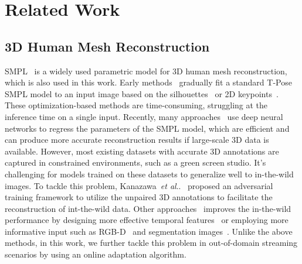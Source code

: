 \documentclass[10pt,journal,compsoc]{IEEEtran}
\makeatletter
\DeclareRobustCommand\onedot{\futurelet\@let@token\@onedot}
\def\@onedot{\ifx\@let@token.\else.\null\fi\xspace}
\def\etal{\emph{et al}\onedot}
\makeatother
\begin{document}
 \section{Related Work}

\subsection{3D Human Mesh Reconstruction}
SMPL~\cite{loper2015smpl} is a widely used parametric model for 3D human mesh reconstruction, which is also used in this work.
Early methods~\cite{guan2009estimating,sigal2008combined,bogo2016keep,lassner2017unite,huang2017towards,zanfir2018monocular} gradually fit a standard T-Pose SMPL model to an input image based on the silhouettes~\cite{lassner2017unite} or 2D keypoints~\cite{bogo2016keep}.
These optimization-based methods are time-consuming, struggling at the inference time on a single input.
Recently, many approaches~\cite{kanazawa2018end,Moon_2020_ECCV_I2L-MeshNet,kocabas2020vibe,kolotouros2019learning,aksan2019structured,xu2019denserac,guler2019holopose,pavlakos2018learning} use deep neural networks to regress the parameters of the SMPL model, which are efficient and can produce more accurate reconstruction results if large-scale 3D data is available.
However, most existing datasets with accurate 3D annotations are captured in constrained environments, such as a green screen studio. It's challenging for models trained on these datasets to generalize well to in-the-wild images.
To tackle this problem, Kanazawa~\etal~\cite{kanazawa2018end} proposed an adversarial training framework to utilize the unpaired 3D annotations to facilitate the reconstruction of int-the-wild data. 
Other approaches~\cite{sun2019human,tung2017self,li2019towards,omran2018neural,rueegg2020chained} improves the in-the-wild performance by designing more effective temporal features~\cite{sun2019human,tung2017self} or employing more informative input such as RGB-D~\cite{li2019towards} and segmentation images~\cite{omran2018neural,rueegg2020chained}.
Unlike the above methods, in this work, we further tackle this problem in out-of-domain streaming scenarios by using an online adaptation algorithm. 
\end{document}
